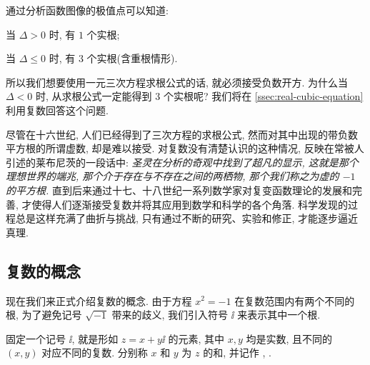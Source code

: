 通过分析函数图像的极值点可以知道:
\begin{enuma}
  \item 当 $\Delta>0$ 时, 有 $1$ 个实根;
  \item 当 $\Delta\le0$ 时, 有 $3$ 个实根(含重根情形).
\end{enuma}

所以我们想要使用一元三次方程求根公式的话, 就\alert{必须接受负数开方}.
为什么当 $\Delta<0$ 时, 从求根公式一定能得到 $3$ 个实根呢?
我们将在 \ref{ssec:real-cubic-equation}利用复数回答这个问题.

尽管在十六世纪, 人们已经得到了三次方程的求根公式, 然而对其中出现的带负数平方根的所谓虚数, 却是难以接受.
对复数没有清楚认识的这种情况, 反映在常被人引述的莱布尼茨的一段话中: \textcolor{third}{\itshape 圣灵在分析的奇观中找到了超凡的显示, 这就是那个理想世界的端兆, 那个介于存在与不存在之间的两栖物, 那个我们称之为虚的 $-1$ 的平方根.}
直到后来通过十七、十八世纪一系列数学家对复变函数理论的发展和完善, 才使得人们逐渐接受复数并将其应用到数学和科学的各个角落.
科学发现的过程总是这样充满了曲折与挑战, 只有通过不断的研究、实验和修正, 才能逐步逼近真理. 


\subsection{复数的概念}


现在我们来正式介绍复数的概念.
由于方程 $x^2=-1$ 在复数范围内有两个不同的根, 为了避免记号 $\sqrt{-1}$ 带来的歧义, 我们引入符号 $\ii$ 来表示其中一个根.

\begin{definition}
  固定一个记号 $\ii$, 就是形如 $z=x+y\ii$ 的元素, 其中 $x,y$ 均是实数, 且不同的 $(x,y)$ 对应不同的复数.
  分别称 $x$ 和 $y$ 为 $z$ 的和, 并记作 , .
\end{definition}

